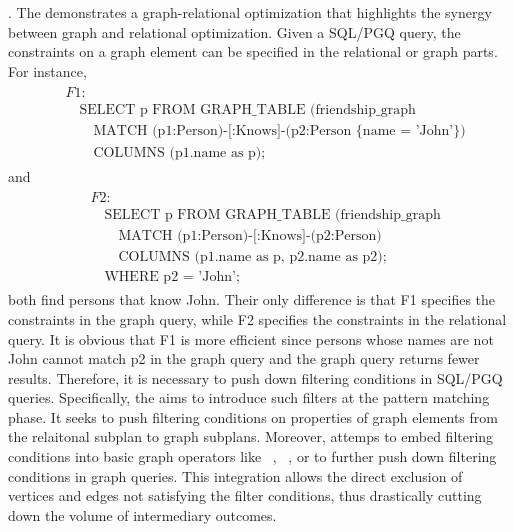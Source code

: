 \filterrule. 
The \filterrule demonstrates a graph-relational optimization that highlights the synergy between graph and relational optimization. 
Given a SQL/PGQ query, the constraints on a graph element can be specified in the relational or graph parts.
For instance, 
\begin{eqnarray*}
    \begin{split}
        & F1: \\
        & \hspace{1em} \text{SELECT p FROM GRAPH\_TABLE (friendship\_graph} \\
        & \hspace{2em} \text{MATCH (p1:Person)-[:Knows]-(p2:Person \{name = 'John'\})} \\
        & \hspace{2em} \text{COLUMNS (p1.name as p);}
    \end{split}
\end{eqnarray*}
and 
\begin{eqnarray*}
    \begin{split}
        & F2: \\
        & \hspace{1em} \text{SELECT p FROM GRAPH\_TABLE (friendship\_graph} \\
        & \hspace{2em} \text{MATCH (p1:Person)-[:Knows]-(p2:Person)} \\
        & \hspace{2em} \text{COLUMNS (p1.name as p, p2.name as p2);} \\
        & \hspace{1em} \text{WHERE p2 = 'John';}
    \end{split}
\end{eqnarray*}
both find persons that know John.
Their only difference is that F1 specifies the constraints in the graph query, while F2 specifies the constraints in the relational query.
It is obvious that F1 is more efficient since persons whose names are not John cannot match p2 in the graph query and the graph query returns fewer results.
Therefore, it is necessary to push down filtering conditions in SQL/PGQ queries.
Specifically, the \filterrule aims to introduce such filters at the pattern matching phase. 
It seeks to push filtering conditions on properties of graph elements from the relaitonal subplan to graph subplans.
Moreover, \filterrule attemps to embed filtering conditions into basic graph operators like \scan~, \expandedge~, or \getvertex to further push down filtering conditions in graph queries. 
This integration allows the direct exclusion of vertices and edges not satisfying the filter conditions, thus drastically cutting down the volume of intermediary outcomes.
